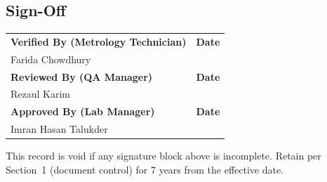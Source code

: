 \subsection{Sign-Off}
\begin{tcolorbox}[recordbox]
\begin{tabularx}{\linewidth}{@{}X X@{}}
\textbf{Verified By (Metrology Technician)} & \textbf{Date} \\[2pt]
Farida Chowdhury \hrulefill & \hrulefill \\[10pt]
\textbf{Reviewed By (QA Manager)} & \textbf{Date} \\[2pt]
Rezaul Karim \hrulefill & \hrulefill \\[10pt]
\textbf{Approved By (Lab Manager)} & \textbf{Date} \\[2pt]
Imran Hasan Talukder \hrulefill & \hrulefill \\
\end{tabularx}
\end{tcolorbox}

\noindent\small\color{gray}
This record is void if any signature block above is incomplete. Retain per Section~1
(document control) for 7 years from the effective date.
